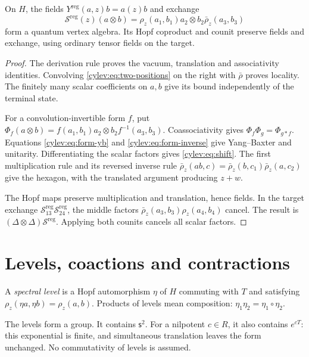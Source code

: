 \begin{proposition}\label{cylev:prop:regular}
On $H$, the fields $Y^{\mathrm{reg}}(a,z)b=a(z)b$ and exchange
\[
 \mathcal S^{\mathrm{reg}}(z)(a\otimes b)
       =\rho_z(a_1,b_1)a_2\otimes b_2\bar\rho_z(a_3,b_3)
\]
form a quantum vertex algebra. Its Hopf coproduct and counit preserve
fields and exchange, using ordinary tensor fields on the target.
\end{proposition}
\begin{proof}
The derivation rule proves the vacuum, translation and associativity
identities. Convolving \eqref{cylev:eq:two-positions} on the right
with $\bar\rho$ proves locality. The finitely many scalar coefficients
on $a,b$ give its bound independently of the terminal state.

For a convolution-invertible form $f$, put
$\Phi_f(a\otimes b)=f(a_1,b_1)a_2\otimes b_2f^{-1}(a_3,b_3)$.
Coassociativity gives $\Phi_f\Phi_g=\Phi_{g*f}$.
Equations \eqref{cylev:eq:form-yb} and
\eqref{cylev:eq:form-inverse} give Yang--Baxter and unitarity.
Differentiating the scalar factors gives \eqref{cylev:eq:shift}.
The first multiplication rule and its reversed inverse rule
$\bar\rho_z(ab,c)=\bar\rho_z(b,c_1)\bar\rho_z(a,c_2)$ give
the hexagon, with the translated argument producing $z+w$.

The Hopf maps preserve multiplication and translation, hence fields.
In the target exchange
$\mathcal S^{\mathrm{reg}}_{13}\mathcal S^{\mathrm{reg}}_{24}$,
the middle factors $\bar\rho_z(a_3,b_3)\rho_z(a_4,b_4)$ cancel.
The result is $(\Delta\otimes\Delta)\mathcal S^{\mathrm{reg}}$.
Applying both counits cancels all scalar factors.
\end{proof}

\section{Levels, coactions and contractions}

\begin{definition}\label{cylev:def:level}
A \emph{spectral level} is a Hopf automorphism $\eta$ of $H$ commuting with
$T$ and satisfying $\rho_z(\eta a,\eta b)=\rho_z(a,b)$.
Products of levels mean composition: $\eta_1\eta_2=\eta_1\circ\eta_2$.
\end{definition}

The levels form a group. It contains $\mathsf s^2$.
For a nilpotent $c\in R$, it also contains $e^{cT}$: this exponential
is finite, and simultaneous translation leaves the form unchanged.
No commutativity of levels is assumed.

